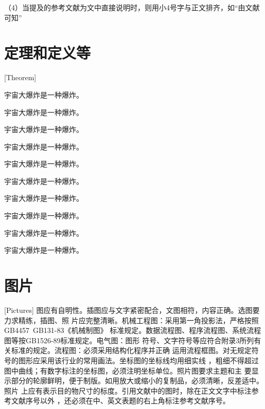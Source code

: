 （4）当提及的参考文献为文中直接说明时，则用小4号字与正文排齐，如“由文献可知”

\section{定理和定义等}[Theorem]
\begin{theorem}
宇宙大爆炸是一种爆炸。
\end{theorem}
\begin{definition}[（霍金）]
宇宙大爆炸是一种爆炸。
\end{definition}
\begin{assumption}
宇宙大爆炸是一种爆炸。
\end{assumption}
\begin{lemma}
宇宙大爆炸是一种爆炸。
\end{lemma}
\begin{corollary}
宇宙大爆炸是一种爆炸。
\end{corollary}
\begin{exercise}
宇宙大爆炸是一种爆炸。
\end{exercise}
\begin{problem}
宇宙大爆炸是一种爆炸。
\end{problem}
\begin{remark}
宇宙大爆炸是一种爆炸。
\end{remark}
\begin{axiom}[（爱因斯坦）]
宇宙大爆炸是一种爆炸。
\end{axiom}
\begin{conjecture}
宇宙大爆炸是一种爆炸。
\end{conjecture}
\section{图片}[Pictures]
图应有自明性。插图应与文字紧密配合，文图相符，内容正确。选图要力求精练，插图、照
片应完整清晰。机械工程图：采用第一角投影法，严格按照GB4457~GB131-83《机械制图》
标准规定。数据流程图、程序流程图、系统流程图等按GB1526-89标准规定。电气图：图形
符号、文字符号等应符合附录3所列有关标准的规定。流程图：必须采用结构化程序并正确
运用流程框图。对无规定符号的图形应采用该行业的常用画法。坐标图的坐标线均用细实线
，粗细不得超过图中曲线；有数字标注的坐标图，必须注明坐标单位。照片图要求主题和主
要显示部分的轮廓鲜明，便于制版。如用放大或缩小的复制品，必须清晰，反差适中。照片
上应有表示目的物尺寸的标度。引用文献中的图时，除在正文文字中标注参考文献序号以外
，还必须在中、英文表题的右上角标注参考文献序号。

